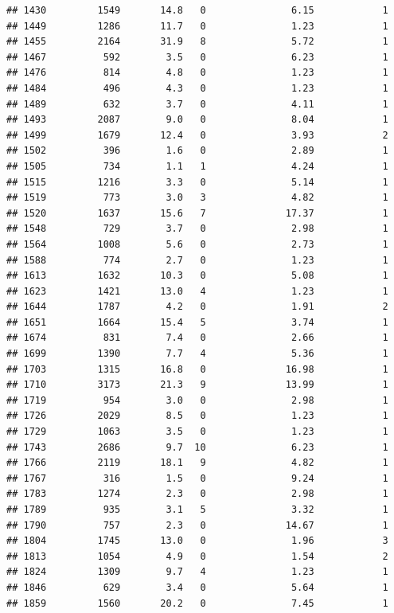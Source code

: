 \documentclass[
]{article}
\begin{document}
\begin{verbatim}
## 1430         1549       14.8   0               6.15            1
## 1449         1286       11.7   0               1.23            1
## 1455         2164       31.9   8               5.72            1
## 1467          592        3.5   0               6.23            1
## 1476          814        4.8   0               1.23            1
## 1484          496        4.3   0               1.23            1
## 1489          632        3.7   0               4.11            1
## 1493         2087        9.0   0               8.04            1
## 1499         1679       12.4   0               3.93            2
## 1502          396        1.6   0               2.89            1
## 1505          734        1.1   1               4.24            1
## 1515         1216        3.3   0               5.14            1
## 1519          773        3.0   3               4.82            1
## 1520         1637       15.6   7              17.37            1
## 1548          729        3.7   0               2.98            1
## 1564         1008        5.6   0               2.73            1
## 1588          774        2.7   0               1.23            1
## 1613         1632       10.3   0               5.08            1
## 1623         1421       13.0   4               1.23            1
## 1644         1787        4.2   0               1.91            2
## 1651         1664       15.4   5               3.74            1
## 1674          831        7.4   0               2.66            1
## 1699         1390        7.7   4               5.36            1
## 1703         1315       16.8   0              16.98            1
## 1710         3173       21.3   9              13.99            1
## 1719          954        3.0   0               2.98            1
## 1726         2029        8.5   0               1.23            1
## 1729         1063        3.5   0               1.23            1
## 1743         2686        9.7  10               6.23            1
## 1766         2119       18.1   9               4.82            1
## 1767          316        1.5   0               9.24            1
## 1783         1274        2.3   0               2.98            1
## 1789          935        3.1   5               3.32            1
## 1790          757        2.3   0              14.67            1
## 1804         1745       13.0   0               1.96            3
## 1813         1054        4.9   0               1.54            2
## 1824         1309        9.7   4               1.23            1
## 1846          629        3.4   0               5.64            1
## 1859         1560       20.2   0               7.45            1

\end{verbatim}
\end{document}
